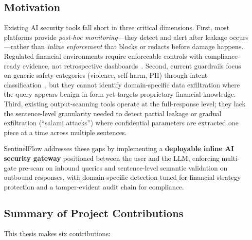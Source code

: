 \documentclass[journal,12pt,onecolumn,draftclsnofoot]{IEEEtran}
\begin{document}
\subsection{Motivation}

Existing AI security tools fall short in three critical dimensions. First, most platforms provide \textit{post-hoc monitoring}---they detect and alert after leakage occurs---rather than \textit{inline enforcement} that blocks or redacts before damage happens. Regulated financial environments require enforceable controls with compliance-ready evidence, not retrospective dashboards~\cite{nist_ai_rmf, nist_ai_600_1}. Second, current guardrails focus on generic safety categories (violence, self-harm, PII) through intent classification~\cite{llama_guard, ms_prompt_shields}, but they cannot identify domain-specific data exfiltration where the query appears benign in form yet targets proprietary financial knowledge. Third, existing output-scanning tools operate at the full-response level; they lack the sentence-level granularity needed to detect partial leakage or gradual exfiltration (``salami attacks'') where confidential parameters are extracted one piece at a time across multiple sentences.

SentinelFlow addresses these gaps by implementing a \textbf{deployable inline AI security gateway} positioned between the user and the LLM, enforcing multi-gate pre-scan on inbound queries and sentence-level semantic validation on outbound responses, with domain-specific detection tuned for financial strategy protection and a tamper-evident audit chain for compliance.

\subsection{Summary of Project Contributions}
This thesis makes six contributions:
\end{document}
